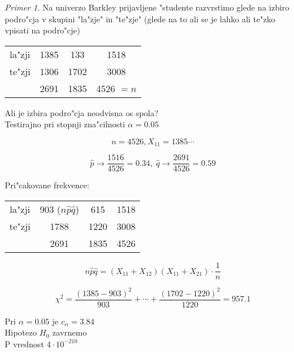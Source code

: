 \documentclass[a4paper,12pt]{article}
\theoremstyle{definition}
\theoremstyle{remark}
\newtheorem*{ex}{Primer}
\begin{document}
\begin{ex}
    Na univerzo Barkley prijavljene "studente razvrstimo glede na izbiro podro"cja v skupini "la"zje" in "te"zje" (glede na to ali
    se je lahko ali te"zko vpisati na podro"cje)

    \begin{center}
        \begin{tabular}{c | c c | c} 
            la"zji & 1385 & 133 & 1518 \\
            te"zji & 1306 & 1702 & 3008 \\
            \hline
            & 2691 & 1835 & 4526 $=n$
        \end{tabular}
    \end{center}

    Ali je izbira podro"cja neodvisna os spola? \\
    Testirajno pri stopnji zna"cilnosti $\alpha = 0.05$

    \begin{equation*}
        n = 4526, X_{11} = 1385 \cdots
    \end{equation*}

    \begin{equation*}
        \hat{p} \to \frac{1516}{4526} = 0.34, \; \hat{q} \to \frac{2691}{4526} = 0.59
    \end{equation*}

    Pri"cakovane frekvence:

    \begin{center}
        \begin{tabular}{c | c c | c} 
            la"zji & 903 ($n \hat{p} \hat{q}$) & 615 & 1518 \\
            te"zji & 1788 & 1220 & 3008 \\
            \hline
            & 2691 & 1835 & 4526
        \end{tabular}
    \end{center}

    \begin{equation*}
        n \hat{p} \hat{q} = (X_{11} + X_{12}) (X_{11} + X_{21}) \cdot \frac{1}{n}
    \end{equation*}

    \begin{equation*}
        \chi^2 = \frac{(1385 - 903)^2}{903} + \cdots + \frac{(1702 - 1220)^2}{1220} = 957.1
    \end{equation*}

    Pri $\alpha = 0.05$ je $c_{\alpha} = 3.84$ \\


    Hipotezo $H_0$ zavrnemo \\
    P vrednost $4 \cdot 10^{-210}$
\end{ex}
\end{document}
